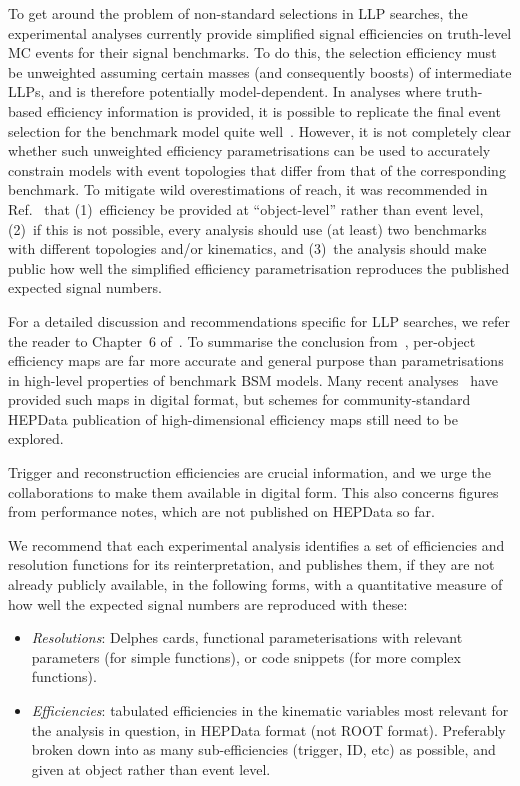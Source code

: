 \documentclass[a4paper,aps,prd,longbibliography,notitlepage,showpacs,amsmath,amssymb,superscriptaddress,nofootinbib,floatfix,11pt,preprintnumbers]{revtex4-1-mod}
\newcommand{\hepdata}{\textsf{HEPData}\xspace}
\renewcommand{\root}{\textsf{ROOT}\xspace}
\newcommand{\delphes}{\textsf{Delphes}\xspace}
\begin{document}
To get around the problem of non-standard selections in LLP searches, the experimental analyses currently provide simplified signal efficiencies on truth-level MC events for their signal benchmarks. To do this, the selection efficiency must be unweighted assuming certain masses (and consequently boosts) of intermediate LLPs, and is therefore potentially model-dependent.  In analyses where truth-based efficiency information is provided, it is possible to replicate the final event selection for the benchmark model quite well~\cite{Brooijmans:2018xbu}.  However, it is not completely clear whether such unweighted efficiency parametrisations can be used to accurately constrain models with event topologies that differ from that of the corresponding benchmark.  To mitigate wild overestimations of reach, it was recommended in Ref.~\cite{Alimena:2019zri} that (1)~efficiency be provided at ``object-level'' rather than event level, (2)~if this is not possible, every analysis should use (at least) two benchmarks with different topologies and/or kinematics, and (3)~the analysis should make public how well the simplified efficiency parametrisation reproduces the published expected signal numbers.

For a detailed discussion and recommendations specific for LLP searches, we refer the reader to  Chapter~6 of~\cite{Alimena:2019zri}.
To summarise the conclusion from~\cite{Allanach:2016pam, Brooijmans:2018xbu},
per-object efficiency maps are far more accurate and general purpose than parametrisations in high-level properties of benchmark BSM models. Many recent analyses~\cite{Khachatryan:2015lla,Aaboud:2017iio,Aaboud:2019trc} have provided such maps in digital format, but schemes for community-standard \hepdata publication of high-dimensional efficiency maps still need to be explored.

Trigger and reconstruction efficiencies are crucial information, and we urge the collaborations to make them available in digital form. This also concerns figures from performance notes, which are not published on \hepdata so far.

We recommend that each experimental analysis identifies a set of efficiencies and resolution functions for its reinterpretation, and publishes them, if they are not already publicly available, in the following forms, with a quantitative measure of how well the expected signal numbers are reproduced with these:
\begin{itemize}
\item \textit{Resolutions}: \delphes cards, functional parameterisations with relevant parameters (for simple functions), or code snippets (for more complex functions).
\item \textit{Efficiencies}: tabulated efficiencies in the kinematic variables most relevant for the analysis in question, in \hepdata format (not \root format).  Preferably broken down into as many sub-efficiencies (trigger, ID, etc) as possible, and given at object rather than event level.
\end{itemize}
\end{document}
